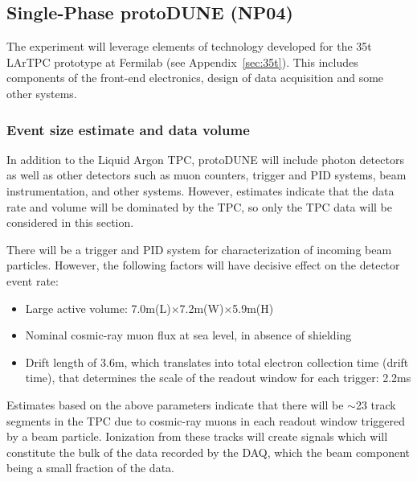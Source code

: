 
\subsection{Single-Phase protoDUNE (NP04)}
The experiment will leverage elements of technology developed for the 35t LArTPC prototype at Fermilab (see Appendix~\ref{sec:35t}).
This includes components of the front-end electronics, design of data acquisition and some other systems.

\subsubsection{Event size estimate and data volume}
\label{sec:protodune-data-volume}
In addition to the Liquid Argon TPC, protoDUNE will include photon detectors as well as other detectors such as muon counters, trigger and PID systems,
beam instrumentation, and other systems.
However, estimates indicate that the data rate and volume will be dominated by the TPC, so only the TPC data will be considered in this section.


There will be a trigger and PID system for characterization of incoming beam particles. However, the following factors will have decisive effect on the detector event rate:
\begin{itemize}
\item Large active volume: 7.0m(L)$\times$7.2m(W)$\times$5.9m(H)
\item Nominal cosmic-ray muon flux at sea level, in absence of shielding
\item Drift length of 3.6m, which translates into total electron collection time (drift time), that  determines the scale of the readout window for each trigger: 2.2ms
\end{itemize}

Estimates based on the above parameters indicate that there will be $\sim$23 track segments in the TPC due to cosmic-ray muons in each readout window
triggered by a beam particle. Ionization from these tracks will create signals which will constitute the bulk of the data recorded by the DAQ, which the beam
component being a small fraction of the data.


